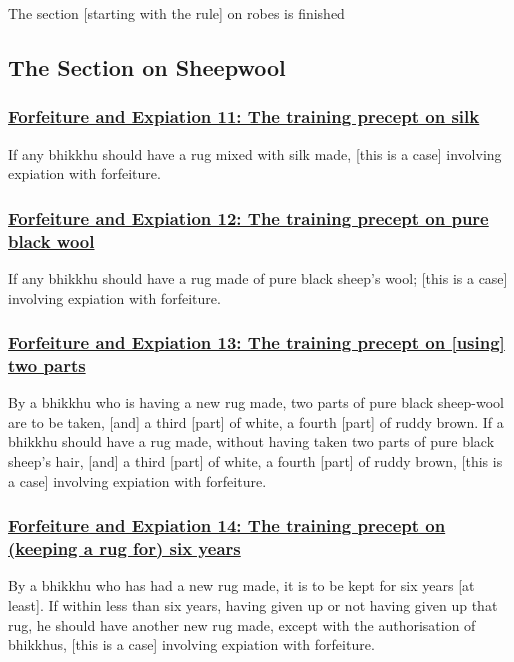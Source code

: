 \begin{center}
  The section [starting with the rule] on robes is finished
\end{center}

\setsubsecheadstyle{\subsectionFmt}
\subsection{The Section on Sheepwool}
\vspace{0.2cm}

\subsubsection*{\hyperref[np11]{Forfeiture and Expiation 11: The training precept on silk}}
\label{forf-exp11}
If any bhikkhu should have a rug mixed with silk made, [this is a case] involving expiation with forfeiture.

\subsubsection*{\hyperref[np12]{Forfeiture and Expiation 12: The training precept on pure black wool}}
\label{forf-exp12}
If any bhikkhu should have a rug made of pure black sheep's wool; [this is a case] involving expiation with forfeiture.

\subsubsection*{\hyperref[np13]{Forfeiture and Expiation 13: The training precept on [using] two parts}}
\label{forf-exp13}
By a bhikkhu who is having a new rug made, two parts of pure black sheep-wool are to be taken, [and] a third [part] of white, a fourth [part] of ruddy brown. If a bhikkhu should have a rug made, without having taken two parts of pure black sheep's hair, [and] a third [part] of white, a fourth [part] of ruddy brown, [this is a case] involving expiation with forfeiture.

\subsubsection*{\hyperref[np14]{Forfeiture and Expiation 14: The training precept on (keeping a rug for) six years}}
\label{forf-exp14}
By a bhikkhu who has had a new rug made, it is to be kept for six years [at least]. If within less than six years, having given up or not having given up that rug, he should have another new rug made, except with the authorisation of bhikkhus, [this is a case] involving expiation with forfeiture.

